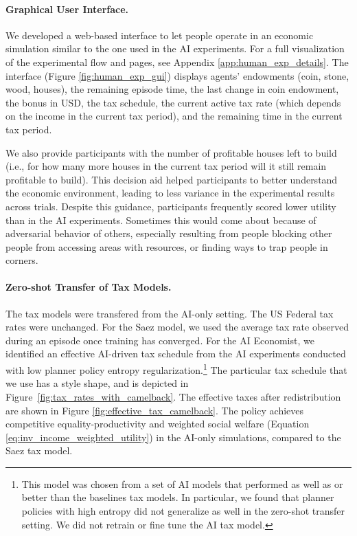 \paragraph{Graphical User Interface.}
We developed a web-based interface to let people operate in an economic simulation similar to the one used in the AI experiments. For a full visualization of the experimental flow and pages, see Appendix \ref{app:human_exp_details}.
The interface (Figure \ref{fig:human_exp_gui}) displays agents' endowments (coin, stone, wood, houses), the remaining episode time, the last change in coin endowment, the bonus in USD, the tax schedule, the current active tax rate (which depends on the income in the current tax period), and the remaining time in the current tax period.

We also provide participants with the number of profitable houses left to build (i.e., for how many more houses in the current tax period will it still remain profitable to build). This decision aid helped participants to better understand the economic environment, leading to less variance in the experimental results across trials.
Despite this guidance, participants frequently scored lower utility than in the AI experiments. Sometimes this would come about because of adversarial behavior of others, especially resulting from people blocking other people from accessing areas with resources, or finding ways to trap people in corners.
\paragraph{Zero-shot Transfer of Tax Models.}
The tax models  were transfered from the AI-only setting.
The US Federal tax rates were unchanged.
For the Saez model, we used the average tax rate observed during an episode once training has converged.
For the AI Economist, we identified an effective AI-driven tax schedule from the AI experiments conducted with low planner policy entropy regularization.\footnote{This model was chosen from a set of AI models that performed as well as or better than the baselines tax models.
In particular, we found that planner policies with high entropy did not generalize as well in the zero-shot transfer setting.
We did not retrain or fine tune the AI tax model.}
The particular tax schedule that we use has a \camelback{} style shape, and is depicted in Figure~\ref{fig:tax_rates_with_camelback}.
The effective taxes after redistribution are shown in Figure \ref{fig:effective_tax_camelback}.
The \camelback{} policy achieves competitive equality-productivity and weighted social welfare (Equation \ref{eq:inv_income_weighted_utility}) in the AI-only simulations, compared to the Saez tax model.

